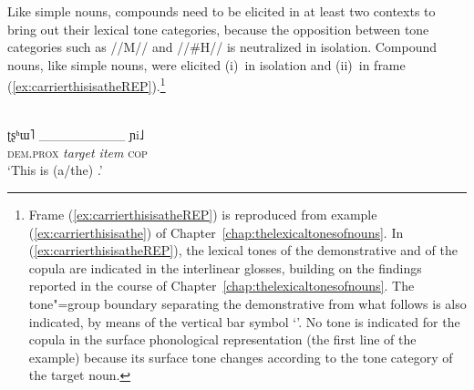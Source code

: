 Like simple nouns, compounds need to be elicited in at least two contexts to bring out their lexical tone
categories, because the opposition between tone categories such as \mbox{//M//} and \mbox{//\#H//} is neutralized in isolation. 
Compound nouns, like simple nouns, were elicited (i)~in isolation and (ii)~in frame (\ref{ex:carrierthisisatheREP}).\footnote{Frame (\ref{ex:carrierthisisatheREP}) is reproduced from example (\ref{ex:carrierthisisathe}) of Chapter~\ref{chap:thelexicaltonesofnouns}. In (\ref{ex:carrierthisisatheREP}), the lexical tones of the {demonstrative} and of the {copula} are indicated in the interlinear glosses, building on the findings reported in the course of Chapter~\ref{chap:thelexicaltonesofnouns}. The tone"=group {boundary} separating the {demonstrative} from what follows is also indicated, by means of the vertical bar symbol ‘\ipa{|}’. No tone is indicated for the {copula} in the surface phonological representation (the first line of the example) because its surface tone changes according to the tone category of the target noun. }

 \begin{exe}
 	\ex
 	\label{ex:carrierthisisatheREP}
	\\
 	\gll ʈʂʰɯ˥ {\_\_\_\_\_\_\_\_\_} ɲi˩\\
 	\textsc{dem.prox} \textit{{target item}}	\textsc{cop}\\
 	\glt	‘This is \mbox{(a/the)} \ipa{{\_\_\_\_\_\_\_\_\_}}.’
 \end{exe}

